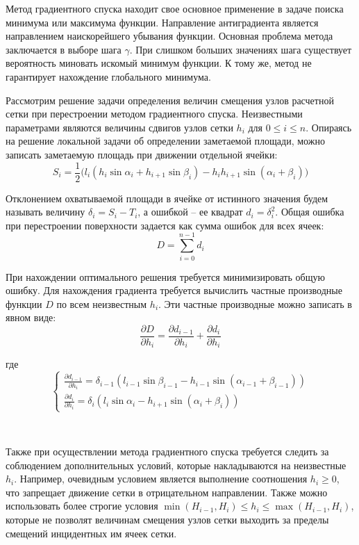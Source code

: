 Метод градиентного спуска находит свое основное применение в задаче поиска минимума или максимума функции.
Направление антиградиента является направлением наискорейшего убывания функции.
Основная проблема метода заключается в выборе шага $\gamma$.
При слишком больших значениях шага существует вероятность миновать искомый минимум функции.
К тому же, метод не гарантирует нахождение глобального минимума.

Рассмотрим решение задачи определения величин смещения узлов расчетной сетки при перестроении методом градиентного спуска.
Неизвестными параметрами являются величины сдвигов узлов сетки $h_i$ для $0 \le i \le n$.
Опираясь на решение локальной задачи об определении заметаемой площади, можно записать заметаемую площадь при движении отдельной ячейки:
\begin{equation}
S_i = \frac{1}{2}\big(l_i(h_i \sin \alpha_i + h_{i + 1} \sin \beta_i) - h_ih_{i + 1} \sin(\alpha_i + \beta_i)\big) 
\end{equation}

Отклонением охватываемой площади в ячейке от истинного значения будем называть величину $\delta_i = S_i - T_i$, а ошибкой -- ее квадрат $d_i = \delta_i^2$.
Общая ошибка при перестроении поверхности задается как сумма ошибок для всех ячеек:
\begin{equation}
D = \sum_{i = 0}^{n - 1}{d_i}
\end{equation}

При нахождении оптимального решения требуется минимизировать общую ошибку.
Для нахождения градиента требуется вычислить частные производные функции $D$ по всем неизвестным $h_i$.
Эти частные производные можно записать в явном виде:
\begin{equation}
\frac{\partial D}{\partial h_i} = \frac{\partial d_{i - 1}}{\partial h_i} + \frac{\partial d_i}{\partial h_i}
\end{equation}

где
\begin{equation}
\begin{cases}
\frac{\partial d_{i - 1}}{\partial h_i} = \delta_{i - 1}(l_{i - 1} \sin \beta_{i - 1} - h_{i - 1} \sin(\alpha_{i - 1} + \beta_{i - 1})) \\
\frac{\partial d_i}{\partial h_i} = \delta_i(l_i \sin \alpha_i - h_{i + 1} \sin(\alpha_i + \beta_i))
\end{cases}
\end{equation}

\

Также при осуществлении метода градиентного спуска требуется следить за соблюдением дополнительных условий, которые накладываются на неизвестные $h_i$.
Например, очевидным условием является выполнение соотношения $h_i \ge 0$, что запрещает движение сетки в отрицательном направлении.
Также можно использовать более строгие условия $\min(H_{i - 1}, H_i) \le h_i \le \max(H_{i - 1}, H_i)$, которые не позволят величинам смещения узлов сетки выходить за пределы смещений инцидентных им ячеек сетки.

